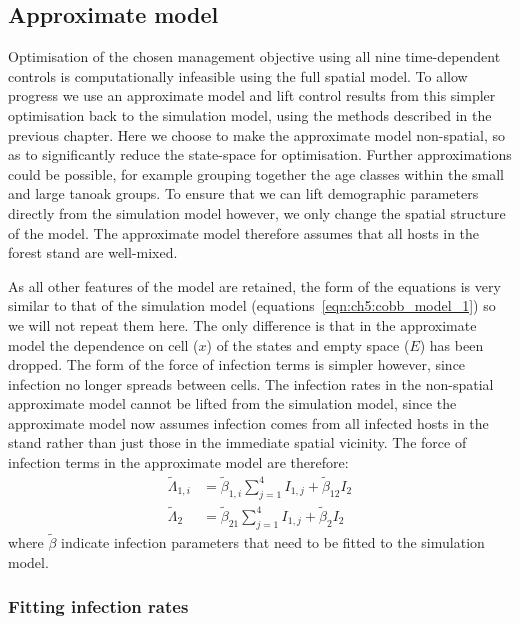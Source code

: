 \subsection{Approximate model}

Optimisation of the chosen management objective using all nine time-dependent controls is computationally infeasible using the full spatial model. To allow progress we use an approximate model and lift control results from this simpler optimisation back to the simulation model, using the methods described in the previous chapter. Here we choose to make the approximate model non-spatial, so as to significantly reduce the state-space for optimisation. Further approximations could be possible, for example grouping together the age classes within the small and large tanoak groups. To ensure that we can lift demographic parameters directly from the simulation model however, we only change the spatial structure of the model. The approximate model therefore assumes that all hosts in the forest stand are well-mixed.

As all other features of the model are retained, the form of the equations is very similar to that of the simulation model (equations~\ref{eqn:ch5:cobb_model_1}) so we will not repeat them here. The only difference is that in the approximate model the dependence on cell ($x$) of the states and empty space ($E$) has been dropped. The form of the force of infection terms is simpler however, since infection no longer spreads between cells. The infection rates in the non-spatial approximate model cannot be lifted from the simulation model, since the approximate model now assumes infection comes from all infected hosts in the stand rather than just those in the immediate spatial vicinity. The force of infection terms in the approximate model are therefore:
\begin{subequations}\label{eqn:ch5:infection_approx}
        \begin{align}
            \tilde{\Lambda}_{1,i} &= \tilde{\beta}_{1,i}\sum_{j=1}^4I_{1,j} + \tilde{\beta}_{12}I_{2} \\
            \tilde{\Lambda}_{2} &= \tilde{\beta}_{21}\sum_{j=1}^4I_{1,j} + \tilde{\beta}_{2}I_{2}
        \end{align}
\end{subequations}
where $\tilde{\beta}$ indicate infection parameters that need to be fitted to the simulation model.

\subsubsection{Fitting infection rates}

